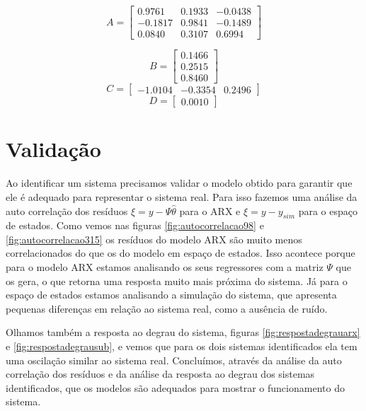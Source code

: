 \begin{equation}
A=\begin{bmatrix}
0.9761  &  0.1933 &  -0.0438\\
-0.1817  &  0.9841  & -0.1489\\
0.0840  &  0.3107  &  0.6994
\end{bmatrix}
\end{equation}

\begin{equation}
B=\begin{bmatrix}
0.1466\\
0.2515\\
0.8460
\end{bmatrix}
\end{equation}
\begin{equation}
C=\begin{bmatrix}
-1.0104 &  -0.3354 &   0.2496
\end{bmatrix}
\end{equation}
\begin{equation}
D=\begin{bmatrix}
0.0010
\end{bmatrix}
\end{equation}

\section{Validação}\label{s4:val}
Ao identificar um sistema precisamos validar o modelo obtido para garantir que ele é adequado para representar o sistema real. Para isso fazemos uma análise da auto correlação dos resíduos $\xi=y-\Psi \hat{\theta}$ para o ARX e $\xi=y-y_{sim}$ para o espaço de estados. Como vemos nas figuras \ref{fig:autocorrelacao98} e \ref{fig:autocorrelacao315} os resíduos do modelo ARX são muito menos correlacionados do que os do modelo em espaço de estados. Isso acontece porque para o modelo ARX estamos analisando os seus regressores com a matriz $\Psi$ que os gera, o que retorna uma resposta muito mais próxima do sistema. Já para o espaço de estados estamos analisando a simulação do sistema, que apresenta pequenas diferenças em relação ao sistema real, como a ausência de ruído.


Olhamos também a resposta ao degrau do sistema, figuras \ref{fig:respostadegrauarx} e \ref{fig:respostadegrausub}, e vemos que para os dois sistemas identificados ela tem uma oscilação similar ao sistema real. Concluímos, através da análise da auto correlação dos resíduos e da análise da resposta ao degrau dos sistemas identificados, que os modelos são adequados para mostrar o funcionamento do sistema.


